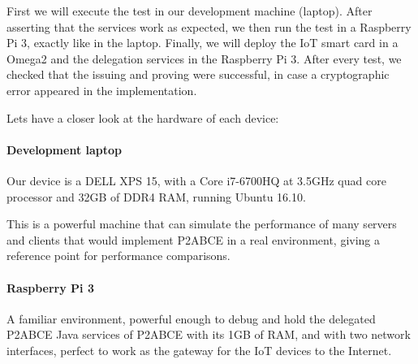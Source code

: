First we will execute the test in our development machine (laptop). After asserting that the services work as expected, we then run the test in a Raspberry Pi 3, exactly like in the laptop. Finally, we will deploy the IoT smart card in a Omega2 and the delegation services in the Raspberry Pi 3. After every test, we checked that the issuing and proving were successful, in case a cryptographic error appeared in the implementation. 

Lets have a closer look at the hardware of each device:


\paragraph{Development laptop}
Our device is a DELL XPS 15, with a Core i7-6700HQ at 3.5GHz quad core processor and 32GB of DDR4 RAM, running Ubuntu 16.10.

This is a powerful machine that can simulate the performance of many servers and clients that would implement P2ABCE in a real environment, giving a reference point for performance comparisons.

\paragraph{Raspberry Pi 3} A familiar environment, powerful enough to debug and hold the delegated P2ABCE Java services of P2ABCE with its 1GB of RAM, and with two network interfaces, perfect to work as the gateway for the IoT devices to the Internet.

